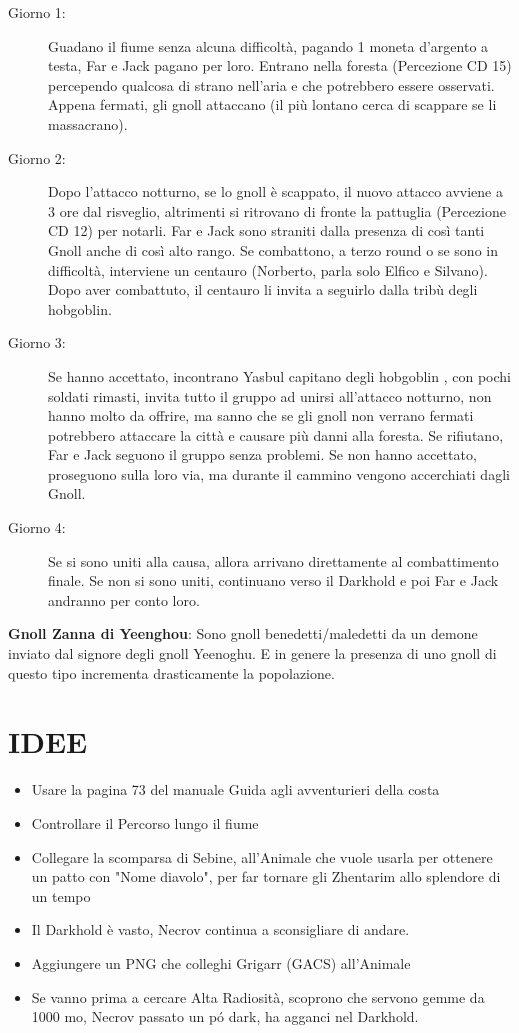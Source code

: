 \documentclass{article}
\begin{document}
\begin{description}
    \item[Giorno 1:] Guadano il fiume senza alcuna difficoltà, pagando 1 moneta d'argento a testa, Far e Jack pagano per loro. Entrano nella foresta (Percezione CD 15) percependo qualcosa di strano nell'aria e che potrebbero essere osservati. Appena fermati, gli gnoll attaccano (il più lontano cerca di scappare se li massacrano).
    
    \item[Giorno 2:] Dopo l'attacco notturno, se lo gnoll è scappato, il nuovo attacco avviene a 3 ore dal risveglio, altrimenti si ritrovano di fronte la pattuglia (Percezione CD 12) per notarli. Far e Jack sono straniti dalla presenza di così tanti Gnoll anche di così alto rango. Se combattono, a terzo round o se sono in difficoltà, interviene un centauro (Norberto, parla solo Elfico e Silvano). Dopo aver combattuto, il centauro li invita a seguirlo dalla tribù degli hobgoblin.
    
    \item[Giorno 3:] Se hanno accettato, incontrano Yasbul capitano degli hobgoblin , con pochi soldati rimasti, invita tutto il gruppo ad unirsi all'attacco notturno, non hanno molto da offrire, ma sanno che se gli gnoll non verrano fermati potrebbero attaccare la città e causare più danni alla foresta. Se rifiutano, Far e Jack seguono il gruppo senza problemi. Se non hanno accettato, proseguono sulla loro via, ma durante il cammino vengono accerchiati dagli Gnoll. 
    
    \item[Giorno 4:] Se si sono uniti alla causa, allora arrivano direttamente al combattimento finale. Se non si sono uniti, continuano verso il Darkhold e poi Far e Jack andranno per conto loro.
\end{description}

\textbf{Gnoll Zanna di Yeenghou}: Sono gnoll benedetti/maledetti da un demone inviato dal signore degli gnoll Yeenoghu. E in genere la presenza di uno gnoll di questo tipo incrementa drasticamente la popolazione. 
        \section{IDEE}
            \begin{itemize}
                \item Usare la pagina 73 del manuale Guida agli avventurieri della costa
                \item Controllare il Percorso lungo il fiume
                \item Collegare la scomparsa di Sebine,  all'Animale che vuole usarla per ottenere un patto con "Nome diavolo", per far tornare  gli Zhentarim allo splendore di un tempo
                \item Il Darkhold è vasto, Necrov continua a sconsigliare di andare.
                \item Aggiungere un PNG che colleghi Grigarr (GACS) all'Animale
                \item Se vanno prima a cercare Alta Radiosità, scoprono che servono gemme da 1000 mo, Necrov passato un pó dark, ha agganci nel Darkhold.  
            \end{itemize}
\end{document}

